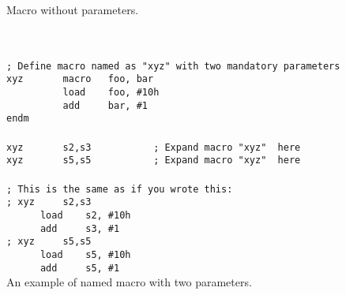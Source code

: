            Macro without parameters.

        {
            ~\\
            \usecodefont\\
            \verb'; Define macro named as "xyz" with two mandatory parameters'\\
            \verb'xyz       macro   foo, bar'\\
            \verb'          load    foo, #10h'\\
            \verb'          add     bar, #1'\\
            \verb'endm'\\\\
            \verb'xyz       s2,s3           ; Expand macro "xyz"  here'\\
            \verb'xyz       s5,s5           ; Expand macro "xyz"  here'\\\\
            \verb'; This is the same as if you wrote this:'\\
            \verb'; xyz     s2,s3'\\
            \verb'      load    s2, #10h'\\
            \verb'      add     s3, #1'\\
            \verb'; xyz     s5,s5'\\
            \verb'      load    s5, #10h'\\
            \verb'      add     s5, #1'\\
        }
        An example of named macro with two parameters.

